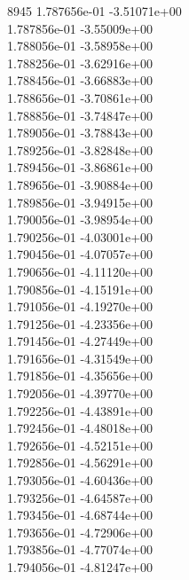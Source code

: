 8945	1.787656e-01	-3.51071e+00	\\ 	1.787856e-01	-3.55009e+00	\\ 	1.788056e-01	-3.58958e+00	\\ 	1.788256e-01	-3.62916e+00	\\ 	1.788456e-01	-3.66883e+00	\\ 	1.788656e-01	-3.70861e+00	\\ 	1.788856e-01	-3.74847e+00	\\ 	1.789056e-01	-3.78843e+00	\\ 	1.789256e-01	-3.82848e+00	\\ 	1.789456e-01	-3.86861e+00	\\ 	1.789656e-01	-3.90884e+00	\\ 	1.789856e-01	-3.94915e+00	\\ 	1.790056e-01	-3.98954e+00	\\ 	1.790256e-01	-4.03001e+00	\\ 	1.790456e-01	-4.07057e+00	\\ 	1.790656e-01	-4.11120e+00	\\ 	1.790856e-01	-4.15191e+00	\\ 	1.791056e-01	-4.19270e+00	\\ 	1.791256e-01	-4.23356e+00	\\ 	1.791456e-01	-4.27449e+00	\\ 	1.791656e-01	-4.31549e+00	\\ 	1.791856e-01	-4.35656e+00	\\ 	1.792056e-01	-4.39770e+00	\\ 	1.792256e-01	-4.43891e+00	\\ 	1.792456e-01	-4.48018e+00	\\ 	1.792656e-01	-4.52151e+00	\\ 	1.792856e-01	-4.56291e+00	\\ 	1.793056e-01	-4.60436e+00	\\ 	1.793256e-01	-4.64587e+00	\\ 	1.793456e-01	-4.68744e+00	\\ 	1.793656e-01	-4.72906e+00	\\ 	1.793856e-01	-4.77074e+00	\\ 	1.794056e-01	-4.81247e+00	\\ \hline
